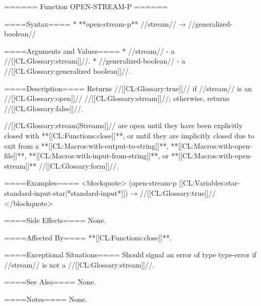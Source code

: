 ====== Function OPEN-STREAM-P ======

====Syntax====
  * **open-stream-p** //stream// → //generalized-boolean//

====Arguments and Values====
  * //stream// - a //[[CL:Glossary:stream]]//.
  * //generalized-boolean// - a //[[CL:Glossary:generalized boolean]]//.

====Description====
Returns //[[CL:Glossary:true]]// if //stream// is an //[[CL:Glossary:open]]// //[[CL:Glossary:stream]]//; otherwise, returns //[[CL:Glossary:false]]//.

//[[CL:Glossary:stream|Streams]]// are open until they have been explicitly closed with **[[CL:Functions:close]]**, or until they are implicitly closed due to exit from a **[[CL:Macros:with-output-to-string]]**, **[[CL:Macros:with-open-file]]**, **[[CL:Macros:with-input-from-string]]**, or **[[CL:Macros:with-open-stream]]** //[[CL:Glossary:form]]//.

====Examples====
<blockquote>
(open-stream-p [[CL:Variables:star-standard-input-star|*standard-input*]]) → //[[CL:Glossary:true]]//
</blockquote>

====Side Effects====
None.

====Affected By====
**[[CL:Functions:close]]**.

====Exceptional Situations====
Should signal an error of type type-error if //stream// is not a //[[CL:Glossary:stream]]//.

====See Also====
None.

====Notes====
None.

